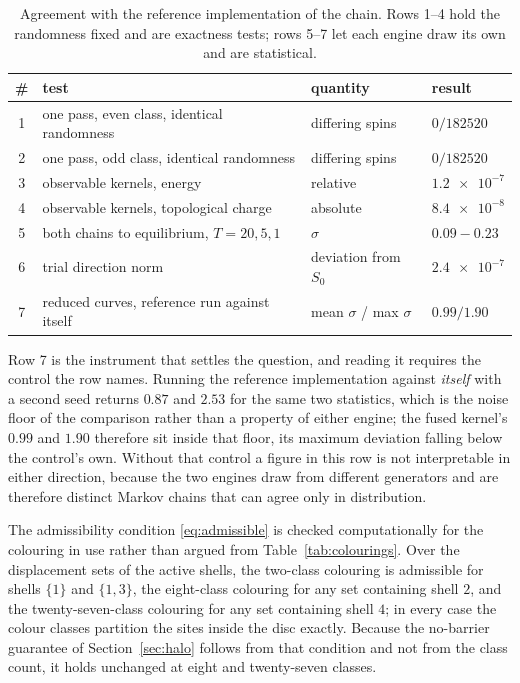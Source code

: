 \documentclass[11pt,a4paper]{article}
\begin{document}
\begin{table}[htbp]
\centering
\caption{Agreement with the reference implementation of the chain. Rows 1--4
hold the randomness fixed and are exactness tests; rows 5--7 let each engine
draw its own and are statistical.}
\label{tab:validation}
\small
\begin{tabular}{clll}
\toprule
\# & test & quantity & result \\
\midrule
1 & one pass, even class, identical randomness & differing spins
  & $0 / \num{182520}$ \\
2 & one pass, odd class, identical randomness & differing spins
  & $0 / \num{182520}$ \\
3 & observable kernels, energy & relative & $\num{1.2e-7}$ \\
4 & observable kernels, topological charge & absolute & $\num{8.4e-8}$ \\
5 & both chains to equilibrium, $T = 20, 5, 1$ & $\sigma$ & $0.09 - 0.23$ \\
6 & trial direction norm & deviation from $S_0$ & $\num{2.4e-7}$ \\
7 & reduced curves, reference run against itself
  & mean $\sigma$ / max $\sigma$ & $0.99 / 1.90$ \\
\bottomrule
\end{tabular}
\end{table}

Row 7 is the instrument that settles the question, and reading it requires the
control the row names. Running the reference implementation against
\emph{itself} with a second seed returns $0.87$ and $2.53$ for the same two
statistics, which is the noise floor of the comparison rather than a property of
either engine; the fused kernel's $0.99$ and $1.90$ therefore sit inside that
floor, its maximum deviation falling below the control's own. Without that
control a figure in this row is not interpretable in either direction, because
the two engines draw from different generators and are therefore distinct Markov
chains that can agree only in distribution.

The admissibility condition \eqref{eq:admissible} is checked computationally for
the colouring in use rather than argued from Table~\ref{tab:colourings}. Over
the displacement sets of the active shells, the two-class colouring is
admissible for shells $\{1\}$ and $\{1,3\}$, the eight-class colouring for any
set containing shell $2$, and the twenty-seven-class colouring for any set
containing shell $4$; in every case the colour classes partition the sites
inside the disc exactly. Because the no-barrier guarantee of
Section~\ref{sec:halo} follows from that condition and not from the class count,
it holds unchanged at eight and twenty-seven classes.
\end{document}
